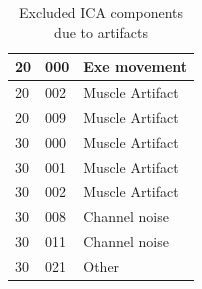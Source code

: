 \documentclass[a4paper]{article}
\begin{document}
\begin{table}[]
\begin{tabular}{|l|l|l|}
20                                                             & 000                                                       & Exe movement                                                               \\ \hline
20                                                             & 002                                                       & Muscle Artifact                                                            \\ \hline
20                                                             & 009                                                       & Muscle Artifact                                                            \\ \hline
30                                                             & 000                                                       & Muscle Artifact                                                            \\ \hline
30                                                             & 001                                                       & Muscle Artifact                                                            \\ \hline
30                                                             & 002                                                       & Muscle Artifact                                                            \\ \hline
30                                                             & 008                                                       & Channel noise                                                              \\ \hline
30                                                             & 011                                                       & Channel noise                                                              \\ \hline
30                                                             & 021                                                       & Other                                                                      \\ \hline
\end{tabular}
\label{tab:icaExclude}
\caption{Excluded ICA components due to artifacts}
\end{table}
\end{document}

